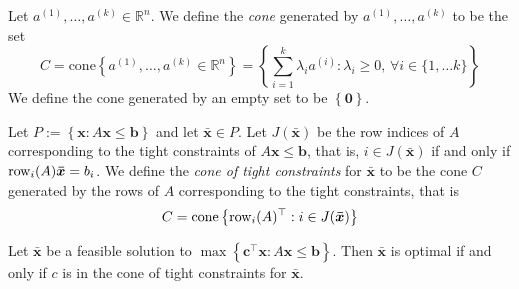 \begin{defbox}
    \begin{definition}
        Let $ a^{(1)},\ldots ,a^{(k)} \in \mathbb{R}^n $.
        We define the \emph{cone} generated by $ a^{(1)},\ldots ,a^{(k)} $ to
        be the set
        \[ C=\text{cone}
            \left\{ a^{(1)},\ldots ,a^{(k)}\in\mathbb{R}^n \right\}=\left\{ \sum\limits_{i=1}^{k} \lambda_i a^{(i)}:\lambda_i\geqslant  0,\,
            \forall i\in\{1,\ldots k\}\right\} \]
        We define the cone generated by an empty set to be $ \left\{\bm{0}\right\} $.
    \end{definition}
\end{defbox}

\begin{defbox}
    \begin{definition}
        Let $ P:=\left\{ \bm{x}:A \bm{x}\leqslant \bm{b}\right\} $ and let
        $ \bm{\bar{x}}\in P $. Let $ J(\bm{\bar{x}}) $ be the row
        indices of $ A $ corresponding to the tight constraints
        of $ A \bm{x}\leqslant \bm{b} $, that is, $ i\in J(\bm{\bar{x}}) $
        if and only if $ \operatorname{row}_i(A)\bm{\bar{x}}=b_i $.
        We define the \emph{cone of tight constraints} for $ \bm{\bar{x}} $ to
        be the cone $ C $ generated by the rows of $ A $ corresponding to
        the tight constraints, that is
        \[ C=\operatorname{cone}\left\{ \operatorname{row}_i(A)^\top:i\in J(\bm{\bar{x}})\right\} \]
    \end{definition}
\end{defbox}

\begin{thmbox}
    \begin{theorem}
        Let $ \bm{\bar{x}} $ be a feasible solution to $ \max \left\{ \bm{c}^\top
            \bm{x}:A \bm{x}\leqslant \bm{b}\right\} $. Then $ \bm{\bar{x}} $ is
        optimal if and only if $ c $ is in the cone of tight constraints
        for $ \bm{\bar{x}} $.
    \end{theorem}
\end{thmbox}